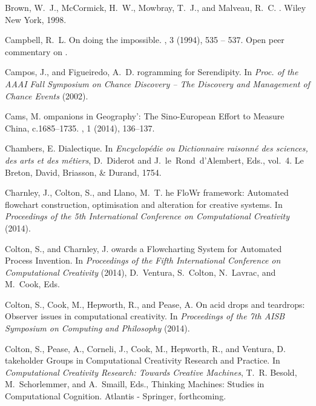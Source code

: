 \documentclass{llncs}
\begin{document}
\begin{thebibliography}{10}
{\sc Brown, W.~J., McCormick, H.~W., Mowbray, T.~J., and Malveau, R.~C.}
.
\newblock Wiley New York, 1998.

{\sc Campbell, R.~L.}
\newblock On doing the impossible.
, 3 (1994), 535 -- 537.
\newblock Open peer commentary on \cite{boden}.

{\sc Campos, J., and Figueiredo, A.~D.}
rogramming for {S}erendipity.
\newblock In {\em Proc. of the AAAI Fall Symposium on Chance Discovery -- The
  Discovery and Management of Chance Events\/} (2002).

{\sc Cams, M.}
ompanions in {G}eography{'}: {T}he {S}ino-{E}uropean {E}ffort
  to {M}easure {C}hina, c.1685--1735.
, 1 (2014), 136--137.

{\sc Chambers, E.}
\newblock Dialectique.
\newblock In {\em Encyclop{\'e}die ou Dictionnaire raisonn{\'e} des sciences,
  des arts et des m{\'e}tiers}, D.~Diderot and J.~le~Rond~d'Alembert, Eds.,
  vol.~4. Le Breton, David, Briasson, \& Durand, 1754.

{\sc Charnley, J., Colton, S., and Llano, M.~T.}
he {F}lo{W}r framework: {A}utomated flowchart construction,
  optimisation and alteration for creative systems.
\newblock In {\em Proceedings of the 5th International Conference on
  Computational Creativity\/} (2014).

{\sc Colton, S., and Charnley, J.}
owards a {F}lowcharting {S}ystem for {A}utomated {P}rocess
  {I}nvention.
\newblock In {\em Proceedings of the Fifth International Conference on
  Computational Creativity\/} (2014), D.~Ventura, S.~Colton, N.~Lavrac, and
  M.~Cook, Eds.

{\sc Colton, S., Cook, M., Hepworth, R., and Pease, A.}
\newblock On acid drops and teardrops: Observer issues in computational
  creativity.
\newblock In {\em Proceedings of the 7th {AISB} {S}ymposium on {C}omputing and
  {P}hilosophy\/} (2014).

{\sc Colton, S., Pease, A., Corneli, J., Cook, M., Hepworth, R., and Ventura,
  D.}
takeholder {G}roups in {C}omputational {C}reativity {R}esearch and
  {P}ractice.
\newblock In {\em Computational Creativity Research: Towards Creative
  Machines}, T.~R. Besold, M.~Schorlemmer, and A.~Smaill, Eds., Thinking
  Machines: Studies in Computational Cognition. Atlantis - Springer,
  forthcoming.


\end{thebibliography}
\end{document}
